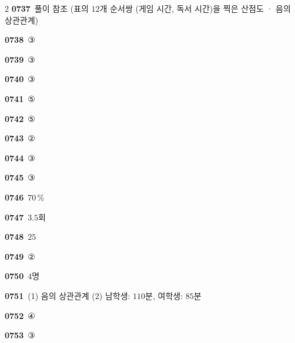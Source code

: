 \documentclass[10pt,a4paper]{article}
\begin{document}
\begin{multicols}{2}
\noindent\textbf{0737}\ 풀이 참조 (표의 $12$개 순서쌍 (게임 시간, 독서 시간)을 찍은 산점도 · 음의 상관관계)\par
\noindent\textbf{0738}\ ③\par
\noindent\textbf{0739}\ ③\par
\noindent\textbf{0740}\ ③\par
\noindent\textbf{0741}\ ⑤\par
\noindent\textbf{0742}\ ⑤\par
\noindent\textbf{0743}\ ②\par
\noindent\textbf{0744}\ ③\par
\noindent\textbf{0745}\ ③\par
\noindent\textbf{0746}\ $70\,\%$\par
\noindent\textbf{0747}\ $3.5$회\par
\noindent\textbf{0748}\ $25$\par
\noindent\textbf{0749}\ ②\par
\noindent\textbf{0750}\ $4$명\par
\noindent\textbf{0751}\ (1) 음의 상관관계 (2) 남학생: $110$분, 여학생: $85$분\par
\noindent\textbf{0752}\ ④\par
\noindent\textbf{0753}\ ③\par
\end{multicols}
\end{document}
